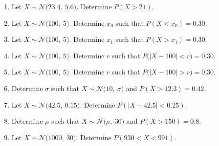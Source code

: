 \documentclass[12pt,letterpaper]{article}
\newcommand{\N}[2]{\mathcal{N}\big(#1,~#2\big)}
\begin{document}
\begin{enumerate}
\newpage

\item Let $X \sim \N{23.4}{5.6}$. Determine $P(X>21)$.
\vfill
\item Let $X \sim \N{100}{5}$. Determine $x_0$ such that $P(X<x_0) = 0.30$.
\vfill
\item Let $X \sim \N{100}{5}$. Determine $x_1$ such that $P(X>x_1) = 0.30$.
\vfill
\item Let $X \sim \N{100}{5}$. Determine $r$ such that $P\big(|X-100|<r\big) = 0.30$.
\vfill
\item Let $X \sim \N{100}{5}$. Determine $r$ such that $P\big(|X-100|>r\big) = 0.30$.
\vfill

\newpage

\item Determine $\sigma$ such that $X \sim \N{10}{\sigma}$ and $P(X > 12.3) = 0.42$.
\vfill
\item Let $X \sim \N{42.5}{0.15}$. Determine $P(|X-42.5| < 0.25)$.
\vfill
\item Determine $\mu$ such that $X \sim \N{\mu}{30}$ and $P(X > 150) = 0.8$.
\vfill
\item Let $X \sim \N{1000}{30}$. Determine $P(930 < X < 991)$.
\vfill
\end{enumerate}
\end{document}
